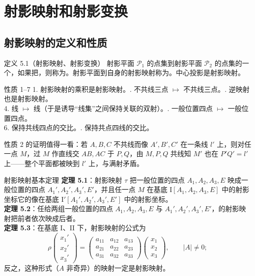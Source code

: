 \section{射影映射和射影变换}

\subsection{射影映射的定义和性质}

\begin{defbox}{定义 5.1（射影映射、射影变换）}
射影平面 $\mathscr P_1$ 的点集到射影平面 $\mathscr P_2$ 的点集的一个，如果把，则称为。射影平面到自身的射影映射称为。中心投影是射影映射。
\end{defbox}

\begin{thmbox}{性质 1–7}
1. 射影映射的乘积是射影映射。. 不共线三点 $\mapsto$ 不共线三点。. 逆映射也是射影映射。\\
4. 线 $\mapsto$ 线（于是诱导“线集”之间保持关联的双射）。. 一般位置四点 $\mapsto$ 一般位置四点。\\
6. 保持共线四点的交比。. 保持共点四线的交比。
\end{thmbox}

性质 2 的证明值得一看：若 $A,B,C$ 不共线而像 $A',B',C'$ 在一条线 $l'$ 上，则对任一点 $M$，过 $M$ 作直线交 $AB,AC$ 于 $P,Q$，由 $M,P,Q$ 共线知 $M'$ 也在 $P'Q'=l'$ 上——整个平面都被映到 $l'$ 上，与满射矛盾。

\begin{thmbox}{射影映射基本定理}
\textbf{定理 5.1}：射影映射 $\tau$ 把一般位置的四点 $A_1,A_2,A_3,E$ 映成一般位置的四点 $A_1',A_2',A_3',E'$，并且任一点 $M$ 在基底 I$[A_1,A_2,A_3,E]$ 中的射影坐标它的像在基底 I$'[A_1',A_2',A_3',E']$ 中的射影坐标。\\[3pt]
\textbf{定理 5.2}：任给两组一般位置的四点 $A_1,A_2,A_3,E$ 与 $A_1',A_2',A_3',E'$，的射影映射把前者依次映成后者。\\[3pt]
\textbf{定理 5.3}：在基底 I、II 下，射影映射的公式为
\begin{equation}
\rho\begin{pmatrix}x_1'\\x_2'\\x_3'\end{pmatrix}=\begin{pmatrix}a_{11}&a_{12}&a_{13}\\a_{21}&a_{22}&a_{23}\\a_{31}&a_{32}&a_{33}\end{pmatrix}\begin{pmatrix}x_1\\x_2\\x_3\end{pmatrix},\qquad |A|\neq0;
\end{equation}
反之，这种形式（$A$ 非奇异）的映射一定是射影映射。
\end{thmbox}

